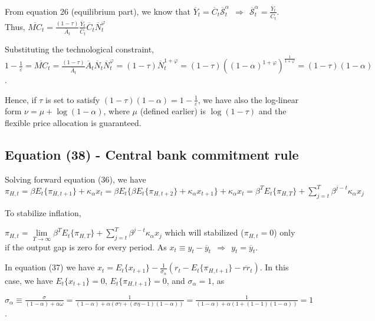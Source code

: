 \documentclass[
]{article}
\begin{document}
From equation 26 (equilibrium part), we know that
\(\displaystyle \overline{Y}_t=\overline{C}_t \mathcal{\overline{S}}_t^\alpha \ \ \Rightarrow \ \  \mathcal{\overline{S}}_t^\alpha = \frac{\overline{Y}_t}{\overline{C}_t}\).
Thus,
\(\displaystyle \overline{MC}_t= \frac{(1-\tau)}{\overline{A}_t} \frac{\overline{Y}_t}{\overline{C}_t} \overline{C}_t \overline{N}_t^\varphi\)

Substituting the technological constraint,
\(\displaystyle 1-\frac{1}{\varepsilon}=\overline{MC}_t= \frac{(1-\tau)}{\overline{A}_t} \overline{A}_t \overline{N}_t \overline{N}_t^\varphi=(1-\tau) \overline{N}_t^{1+\varphi}=(1-\tau)\left( (1-\alpha)^{1+\varphi} \right)^{\frac{1}{1+\varphi}}=(1-\tau)(1-\alpha)\).

Hence, if \(\tau\) is set to satisfy
\(\displaystyle (1-\tau)(1-\alpha)= 1-\frac{1}{\varepsilon}\), we have
also the log-linear form \(\nu=\mu+\log(1-\alpha)\), where \(\mu\)
(defined earlier) is \(\log(1-\tau)\) and the flexible price allocation
is guaranteed.

\hypertarget{equation-38---central-bank-commitment-rule}{%
\subsection{Equation (38) - Central bank commitment
rule}\label{equation-38---central-bank-commitment-rule}}

Solving forward equation (36), we have
\(\displaystyle \pi_{H,t}=\beta E_t\{ \pi_{H,t+1} \}+ \kappa_\alpha x_t = \beta E_t\{ \beta E_t \{ \pi_{H,t+2} \}+ \kappa_\alpha x_{t+1}\}+ \kappa_\alpha x_t=\beta^T E_t\{\pi_{H,T}\} + \sum_{j=t}^T \beta^{j-t}\kappa_\alpha x_j\)

To stabilize inflation,

\(\displaystyle \pi_{H,t} =\underset{T \rightarrow \infty} \lim\beta^T E_t\{\pi_{H,T}\} + \sum_{j=t}^T \beta^{j-t}\kappa_\alpha x_j\)
which will stabilized (\(\pi_{H,t}=0\)) only if the output gap is zero
for every period. As
\(x_t \equiv y_t-\overline{y}_t \ \ \Rightarrow \ \ y_t=\overline{y}_t\).

In equation (37) we have
\(\displaystyle x_t = E_t\{x_{t+1}\} -\frac{1}{\sigma_\alpha}(r_t-E_t\{\pi_{H,t+1}\} -\overline{rr}_t)\).
In this case, we have \(E_t\{x_{t+1}\}=0\), \(E_t\{\pi_{H,t+1}\}=0\),
and \(\sigma_\alpha=1\), as

\(\displaystyle \sigma_\alpha \equiv \frac{\sigma}{(1-\alpha)+\alpha \omega}=\frac{1}{(1-\alpha)+\alpha (\sigma \gamma+(\sigma \eta -1 )(1-\alpha))}=\frac{1}{(1-\alpha)+\alpha (1+(1 -1 )(1-\alpha))}=1\).
\end{document}
